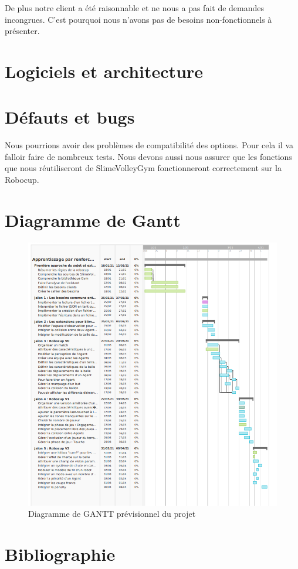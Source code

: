 \documentclass[11pt, a4paper]{article}
\begin{document}
De plus notre client a été raisonnable et ne nous a pas fait de demandes incongrues. C'est pourquoi nous n'avons pas de besoins non-fonctionnels à présenter.

\section{Logiciels et architecture}


\section{Défauts et bugs}
Nous pourrions avoir des problèmes de compatibilité des options. Pour cela il va falloir faire de nombreux tests. 
Nous devons aussi nous assurer que les fonctions que nous réutiliseront de SlimeVolleyGym fonctionneront correctement sur la Robocup. 


\section{Diagramme de Gantt}
\begin{figure}[H]
    \centering
    \includegraphics[scale=0.75]{images/GANTT.PNG}
    \caption {Diagramme de GANTT prévisionnel du projet}
\end{figure}

\section{Bibliographie}



\end{document}

